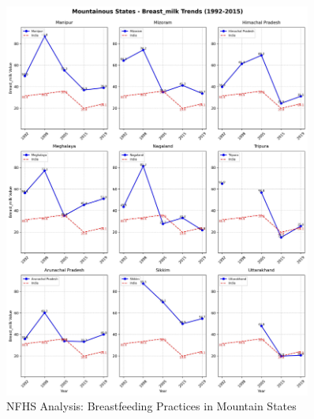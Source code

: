 \begin{figure}[H]
    \centering
    \includegraphics[width=0.9\textwidth]{figures/nfhs/mountainous_states_breast_milk_subplots.pdf}
    \caption{NFHS Analysis: Breastfeeding Practices in Mountain States}
    \label{fig:nfhs_mountain_breast_milk}
\end{figure}

